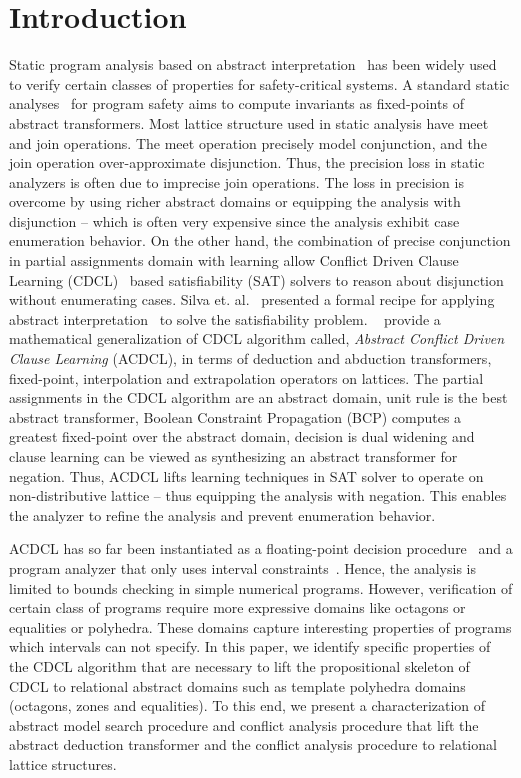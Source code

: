\section{Introduction}
%
Static program analysis based on abstract 
interpretation~\cite{DBLP:conf/emsoft/Cousot07} has been widely used to
verify certain classes of properties for safety-critical systems.  A 
standard static analyses~\cite{se2011} for program safety aims to compute 
invariants as fixed-points of abstract transformers.  Most lattice structure 
used in static analysis have meet and join operations.  The meet operation 
precisely model conjunction, and the join operation over-approximate 
disjunction. Thus, the precision loss in static analyzers is often 
due to imprecise join operations. The loss in precision is overcome 
by using richer abstract domains or equipping the analysis with disjunction --
which is often very expensive since the analysis exhibit case enumeration 
behavior. 
On the other hand, the combination of precise conjunction in partial assignments 
domain with learning allow Conflict Driven Clause Learning (CDCL)~\cite{cdcl}
based satisfiability (SAT) solvers to reason about disjunction without 
enumerating cases.  Silva et. al.~\cite{tacas12, sas12, dhk2013-popl} presented 
a formal recipe for applying abstract interpretation~\cite{se2011} to solve the 
satisfiability problem.  ~\cite{sas12} provide a mathematical generalization 
of CDCL algorithm called, {\em Abstract Conflict Driven Clause Learning} (ACDCL), 
in terms of deduction and abduction transformers, fixed-point, interpolation 
and extrapolation operators on lattices.  The partial assignments in the 
CDCL algorithm are an abstract domain, unit rule is the best abstract 
transformer,  Boolean Constraint Propagation (BCP) computes a greatest fixed-point 
over the abstract domain, decision is dual widening and clause learning can be 
viewed as synthesizing an abstract transformer for negation.  Thus, ACDCL 
lifts learning techniques in SAT solver to operate on non-distributive 
lattice -- thus equipping the analysis with negation. This enables the 
analyzer to refine the analysis and prevent enumeration behavior.

ACDCL has so far been instantiated as a floating-point
decision procedure~\cite{DBLP:journals/fmsd/BrainDGHK14} and a program analyzer 
that only uses interval constraints~\cite{tacas12}.  Hence, the analysis is 
limited to bounds checking in simple numerical programs.  However, verification of 
certain class of programs require more expressive domains like octagons or 
equalities or polyhedra.  These domains capture interesting properties of
programs which intervals can not specify.  In this paper, we identify specific 
properties of the CDCL algorithm that are necessary to lift the propositional 
skeleton of CDCL to relational abstract domains such as template polyhedra 
domains~\cite{sriram} (octagons, zones and equalities).  To this end, we 
present a characterization of abstract model search procedure and conflict 
analysis procedure that lift the abstract deduction transformer and the conflict 
analysis procedure to relational lattice structures. 
